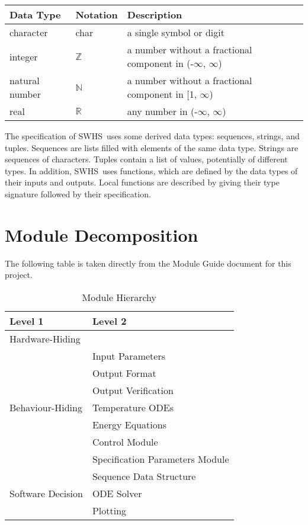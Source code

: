 \documentclass[12pt, titlepage]{article}
\newcommand{\progname}{SWHS}
\begin{document}
\begin{center}
\renewcommand{\arraystretch}{1.2}
\noindent 
\begin{tabular}{l l p{7.5cm}} 
\toprule 
\textbf{Data Type} & \textbf{Notation} & \textbf{Description}\\ 
\midrule
character & char & a single symbol or digit\\
integer & $\mathbb{Z}$ & a number without a fractional component in (-$\infty$, $\infty$) \\
natural number & $\mathbb{N}$ & a number without a fractional component in [1, $\infty$) \\
real & $\mathbb{R}$ & any number in (-$\infty$, $\infty$)\\
\bottomrule
\end{tabular} 
\end{center}

\noindent
The specification of \progname \ uses some derived data types: sequences, strings, and
tuples. Sequences are lists filled with elements of the same data type. Strings
are sequences of characters. Tuples contain a list of values, potentially of
different types. In addition, \progname \ uses functions, which
are defined by the data types of their inputs and outputs. Local functions are
described by giving their type signature followed by their specification.

\section{Module Decomposition}

The following table is taken directly from the Module Guide document for this project.

\begin{table}[h!]
\centering
\begin{tabular}{p{} p{}}
\toprule
\textbf{Level 1} & \textbf{Level 2}\\
\midrule

{Hardware-Hiding} & ~ \\
\midrule

\multirow{7}{0.3\textwidth}{Behaviour-Hiding} & Input Parameters\\
& Output Format\\
& Output Verification\\
& Temperature ODEs\\
& Energy Equations\\ 
& Control Module\\
& Specification Parameters Module\\
\midrule

\multirow{3}{0.3\textwidth}{Software Decision} & {Sequence Data Structure}\\
& ODE Solver\\
& Plotting\\
\bottomrule

\end{tabular}
\caption{Module Hierarchy}
\label{TblMH}
\end{table}
\end{document}
